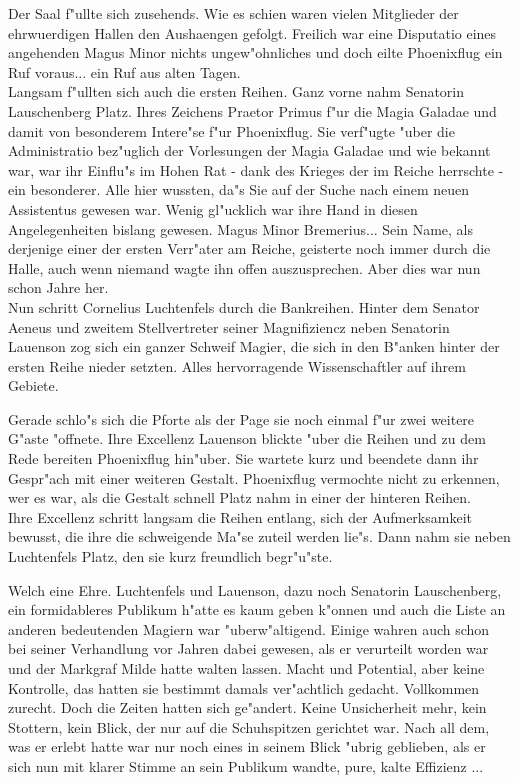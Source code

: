 \documentclass[a5paper,8pt]{book}
\begin{document}
Der Saal f"ullte sich zusehends. Wie es schien waren vielen Mitglieder der ehrwuerdigen Hallen den Aushaengen gefolgt. Freilich war eine Disputatio eines angehenden Magus 
Minor nichts ungew"ohnliches und doch eilte Phoenixflug ein Ruf voraus... ein Ruf aus alten Tagen.\\

Langsam f"ullten sich auch die ersten Reihen. Ganz vorne nahm Senatorin Lauschenberg Platz. Ihres Zeichens Praetor Primus f"ur die Magia Galadae und damit von besonderem 
Intere"se f"ur Phoenixflug. Sie verf"ugte "uber die Administratio bez"uglich der Vorlesungen der Magia Galadae und wie bekannt war, war ihr Einflu"s im Hohen Rat - dank 
des Krieges der im Reiche herrschte - ein besonderer. Alle hier wussten, da"s Sie auf der Suche nach einem neuen Assistentus gewesen war. Wenig gl"ucklich war ihre Hand in 
diesen Angelegenheiten bislang gewesen. Magus Minor Bremerius... Sein Name, als derjenige einer der ersten Verr"ater am Reiche, geisterte noch immer durch die Halle, auch 
wenn niemand wagte ihn offen auszusprechen. Aber dies war nun schon Jahre her.\\

Nun schritt Cornelius Luchtenfels durch die Bankreihen. Hinter dem Senator Aeneus und zweitem Stellvertreter seiner Magnifiziencz neben Senatorin Lauenson zog sich ein ganzer 
Schweif Magier, die sich in den B"anken hinter der ersten Reihe nieder setzten. Alles hervorragende Wissenschaftler auf ihrem Gebiete.\

Gerade schlo"s sich die Pforte als der Page sie noch einmal f"ur zwei weitere G"aste "offnete. Ihre Excellenz Lauenson blickte "uber die Reihen und zu dem Rede bereiten 
Phoenixflug hin"uber. Sie wartete kurz und beendete dann ihr Gespr"ach mit einer weiteren Gestalt. Phoenixflug vermochte nicht zu erkennen, wer es war, als die Gestalt schnell 
Platz nahm in einer der hinteren Reihen.\\

Ihre Excellenz schritt langsam die Reihen entlang, sich der Aufmerksamkeit bewusst, die ihre die schweigende Ma"se zuteil werden lie"s. Dann nahm sie neben Luchtenfels Platz, 
den sie kurz freundlich begr"u"ste.\

Welch eine Ehre. Luchtenfels und Lauenson, dazu noch Senatorin Lauschenberg, ein formidableres Publikum h"atte es kaum geben k"onnen und auch die Liste an anderen bedeutenden 
Magiern war "uberw"altigend. Einige wahren auch schon bei seiner Verhandlung vor Jahren dabei gewesen, als er verurteilt worden war und der Markgraf Milde hatte walten lassen. 
Macht und Potential, aber keine Kontrolle, das hatten sie bestimmt damals ver"achtlich gedacht. Vollkommen zurecht. Doch die Zeiten hatten sich ge"andert. Keine Unsicherheit 
mehr, kein Stottern, kein Blick, der nur auf die Schuhspitzen gerichtet war. Nach all dem, was er erlebt hatte war nur noch eines in seinem Blick "ubrig geblieben, als er sich 
nun mit klarer Stimme an sein Publikum wandte, pure, kalte Effizienz ...\\
\end{document}
